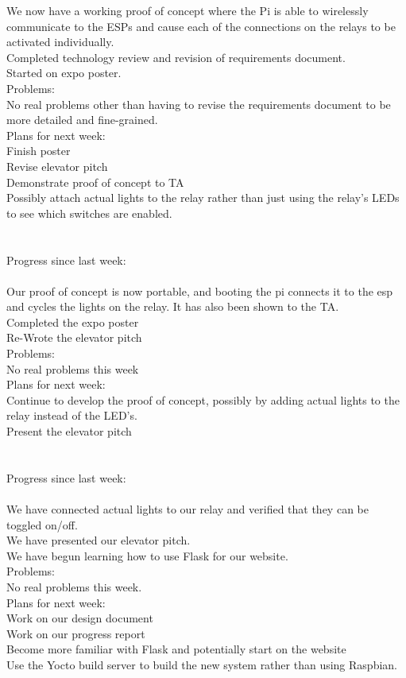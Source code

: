 \documentclass[letterpaper,10pt]{article}
\begin{document}
​​We now have a working proof of concept where the Pi is able to wirelessly communicate to the ESPs and cause each of the connections on the relays to be activated individually. \\
Completed technology review and revision of requirements document. \\
Started on expo poster. \\
Problems: \\
​No real problems other than having to revise the requirements document to be more detailed and fine-grained. \\
​​Plans for next week: \\
Finish poster \\
Revise elevator pitch \\
Demonstrate proof of concept to TA \\
Possibly attach actual lights to the relay rather than just using the relay's LEDs to see which switches are enabled. \\
 \\
 \\
Progress since last week: \\
 \\
Our proof of concept is now portable, and booting the pi connects it to the esp and cycles the lights on the relay.​ It has also been shown to the TA. \\
​​​​​Completed the expo poster \\
​​​Re-Wrote​ the elevator pitch​​ \\
Problems:​​ \\
No real problems this week \\
​​Plans for next week:​​ \\
Continue to develop the proof of concept, possibly by adding actual lights to the relay instead of the LED's. \\
Present the elevator pitch \\
 \\
 \\
Progress since last week: \\
 \\
We have connected actual lights to our relay and verified that they can be toggled on/off. \\
​​​​​We have presented our elevator pitch. \\
We have begun learning how to use Flask for our website. \\
Problems:​​ \\
No real problems this week. \\
​​Plans for next week:​​ \\
Work on our design document​ \\
Work on our progress report \\
Become more familiar with Flask and potentially start on the website \\
Use the Yocto build server to build the new system rather than using Raspbian. \\
\end{document}
